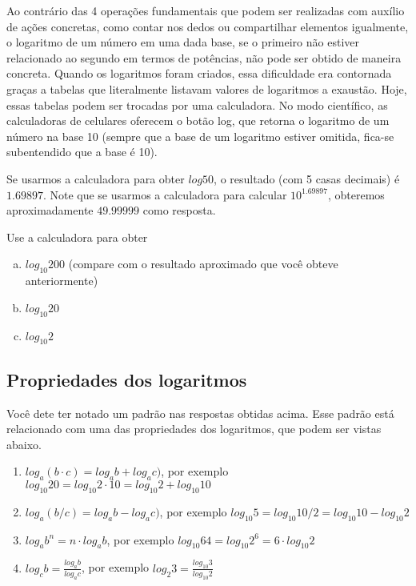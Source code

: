 \documentclass[main_estudante.tex]{subfiles}
\begin{document}
Ao contrário das 4 operações fundamentais que podem ser realizadas com auxílio de ações concretas, como contar nos dedos ou compartilhar elementos igualmente, o logaritmo de um número em uma dada base, se o primeiro não estiver relacionado ao segundo em termos de potências, não pode ser obtido de maneira concreta. Quando os logaritmos foram criados, essa dificuldade era contornada graças a tabelas que literalmente listavam valores de logaritmos a exaustão. Hoje, essas tabelas podem ser trocadas por uma calculadora. No modo científico, as calculadoras de celulares oferecem o botão log, que retorna o logaritmo de um número na base 10 (sempre que a base de um logaritmo estiver omitida, fica-se subentendido que a base é 10).

Se usarmos a calculadora para obter $log 50$, o resultado (com 5 casas decimais) é $1.69897$. Note que se usarmos a calculadora para calcular $10^1.69897$, obteremos aproximadamente $49.99999$ como resposta.

\begin{questao}
Use a calculadora para obter
\begin{enumerate}[a)]
\item $log_{10} 200$ (compare com o resultado aproximado que você obteve anteriormente)
\item $log_{10} 20$
\item $log_{10} 2$
\end{enumerate}
\end{questao}

\subsection*{Propriedades dos logaritmos}

Você dete ter notado um padrão nas respostas obtidas acima. Esse padrão está relacionado com uma das propriedades dos logaritmos, que podem ser vistas abaixo.

\begin{caixaExemplo}
\begin{enumerate}
 \item $log_a (b \cdot c) = log_a b + log_a c)$, por exemplo $log_{10} 20 = log_{10} 2 \cdot 10 = log_{10} 2 + log_{10} 10$
 \item $log_a (b/c) = log_a b - log_a c)$, por exemplo $log_{10} 5 = log_{10} 10/2 = log_{10} 10 - log_{10} 2$
 \item $log_a b^n = n \cdot log_a b$, por exemplo $log_{10} 64 = log_{10} 2^6 = 6 \cdot log_{10} 2$
 \item $log_c b = \frac{log_a b}{log_a c}$, por exemplo $log_2 3 = \frac{log_{10} 3}{log_{10} 2}$
\end{enumerate}
\end{caixaExemplo}
\end{document}
